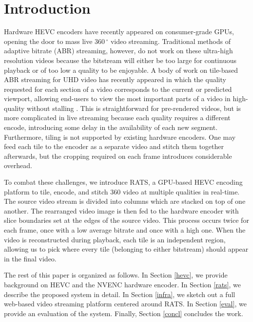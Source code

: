 
\section{Introduction} \label{intro}

Hardware HEVC encoders have recently appeared on consumer-grade GPUs, opening the door to mass live $360\,^{\circ}$ video streaming. Traditional methods of adaptive bitrate (ABR) streaming, however, do not work on these ultra-high resolution videos because the bitstream will either be too large for continuous playback or of too low a quality to be enjoyable. A body of work on tile-based ABR streaming for UHD video has recently appeared in which the quality requested for each section of a video corresponds to the current or predicted viewport, allowing end-users to view the most important parts of a video in high-quality without stalling \cite{lefeuvre2016,corbillon2016,PetrangeliSHT17}. This is straightforward for pre-rendered videos, but is more complicated in live streaming because each quality requires a different encode, introducing some delay in the availability of each new segment. Furthermore, tiling is not supported by existing hardware encoders. One may feed each tile to the encoder as a separate video and stitch them together afterwards, but the cropping required on each frame introduces considerable overhead.

To combat these challenges, we introduce RATS, a GPU-based HEVC encoding platform to tile, encode, and stitch 360 video at multiple qualities in real-time. The source video stream is divided into columns which are stacked on top of one another. The rearranged video image is then fed to the hardware encoder with slice boundaries set at the edges of the source video. This process occurs twice for each frame, once with a low average bitrate and once with a high one. When the video is reconstructed during playback, each tile is an independent region, allowing us to pick where every tile (belonging to either bitstream) should appear in the final video.

The rest of this paper is organized as follows. In Section \ref{hevc}, we provide background on HEVC and the NVENC hardware encoder. In Section \ref{rats}, we describe the proposed system in detail. In Section \ref{infra}, we sketch out a full web-based video streaming platform centered around RATS. In Section \ref{eval}, we provide an evaluation of the system. Finally, Section \ref{concl} concludes the work.

